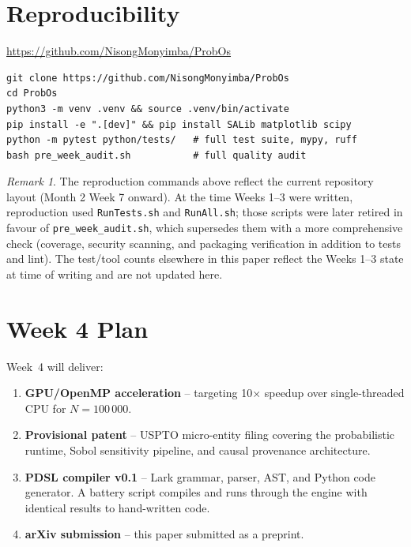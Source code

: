 \documentclass[12pt,a4paper]{article}
\theoremstyle{plain}
\theoremstyle{definition}
\theoremstyle{remark}
\newtheorem{remark}{Remark}[section]
\begin{document}
\section{Reproducibility}

\begin{center}
\url{https://github.com/NisongMonyimba/ProbOs}
\end{center}

\begin{lstlisting}[style=python,numbers=none]
git clone https://github.com/NisongMonyimba/ProbOs
cd ProbOs
python3 -m venv .venv && source .venv/bin/activate
pip install -e ".[dev]" && pip install SALib matplotlib scipy
python -m pytest python/tests/   # full test suite, mypy, ruff
bash pre_week_audit.sh           # full quality audit
\end{lstlisting}

\begin{remark}
The reproduction commands above reflect the current repository
layout (Month 2 Week 7 onward). At the time Weeks 1--3 were
written, reproduction used \texttt{RunTests.sh} and
\texttt{RunAll.sh}; those scripts were later retired in favour
of \texttt{pre\_week\_audit.sh}, which supersedes them with a
more comprehensive check (coverage, security scanning, and
packaging verification in addition to tests and lint). The
test/tool counts elsewhere in this paper reflect the Weeks 1--3
state at time of writing and are not updated here.
\end{remark}

\section{Week 4 Plan}

Week~4 will deliver:
\begin{enumerate}
  \item \textbf{GPU/OpenMP acceleration} -- targeting 10$\times$
    speedup over single-threaded CPU for $N=100\,000$.
  \item \textbf{Provisional patent} -- USPTO micro-entity filing
    covering the probabilistic runtime, Sobol sensitivity pipeline,
    and causal provenance architecture.
  \item \textbf{PDSL compiler v0.1} -- Lark grammar, parser, AST,
    and Python code generator. A battery script compiles and runs
    through the engine with identical results to hand-written code.
  \item \textbf{arXiv submission} -- this paper submitted as
    a preprint.
\end{enumerate}
\end{document}
